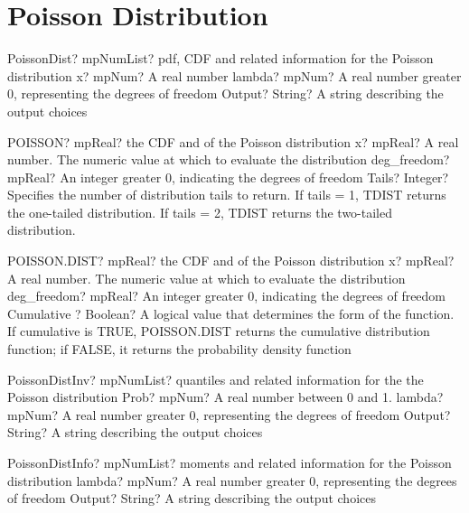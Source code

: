 \documentclass[12pt,a4paper,openany]{book}
\begin{document}
\section{Poisson Distribution}

\begin{mpFunctionsExtract}
\mpFunctionThreeNotImplemented
{PoissonDist? mpNumList? pdf, CDF and related information for the Poisson distribution}
{x? mpNum? A real number}
{lambda? mpNum? A real number greater 0, representing the degrees of freedom}
{Output? String? A string describing the output choices}
\end{mpFunctionsExtract}

\begin{mpFunctionsExtract}
\mpWorksheetFunctionThreeNotImplemented
{POISSON? mpReal? the CDF and of the Poisson distribution}
{x? mpReal? A real number. The numeric value at which to evaluate the distribution}
{deg\_freedom? mpReal? An integer  greater 0, indicating the degrees of freedom}
{Tails? Integer? Specifies the number of distribution tails to return. If tails = 1, TDIST returns the one-tailed distribution. If tails = 2, TDIST returns the two-tailed distribution.}
\end{mpFunctionsExtract}

\begin{mpFunctionsExtract}
\mpWorksheetFunctionThreeNotImplemented
{POISSON.DIST? mpReal? the CDF and of the Poisson distribution}
{x? mpReal? A real number. The numeric value at which to evaluate the distribution}
{deg\_freedom? mpReal? An integer  greater 0, indicating the degrees of freedom}
{Cumulative ? Boolean? A logical value that determines the form of the function. If cumulative is TRUE, POISSON.DIST returns the cumulative distribution function; if FALSE, it returns the probability density function}
\end{mpFunctionsExtract}

\begin{mpFunctionsExtract}
\mpFunctionThreeNotImplemented
{PoissonDistInv? mpNumList? quantiles and related information for the the Poisson distribution}
{Prob? mpNum? A real number between 0 and 1.}
{lambda? mpNum? A real number greater 0, representing the degrees of freedom}
{Output? String? A string describing the output choices}
\end{mpFunctionsExtract}

\begin{mpFunctionsExtract}
\mpFunctionTwoNotImplemented
{PoissonDistInfo? mpNumList? moments and related information for the Poisson distribution}
{lambda? mpNum? A real number greater 0, representing the degrees of freedom}
{Output? String? A string describing the output choices}
\end{mpFunctionsExtract}
\end{document}
